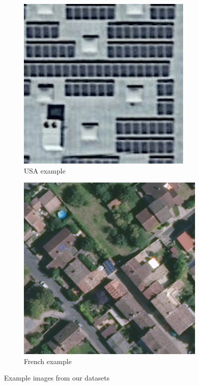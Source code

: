 \documentclass[10pt,twocolumn,letterpaper]{article}
\begin{document}
\begin{figure}[htp]
\centering
\begin{subfigure}{.2\textwidth}
    \centering
    \includegraphics[width=.95\linewidth]{img_usa.png}  
    \caption{USA example}
\end{subfigure}
\begin{subfigure}{.2\textwidth}
    \centering
    \includegraphics[width=.95\linewidth]{img_french.png}  
    \caption{French example}
\end{subfigure}
\captionsetup{justification=centering,margin=0cm}
\caption{Example images from our datasets}
\label{fig:datasets}
\end{figure}
\end{document}
